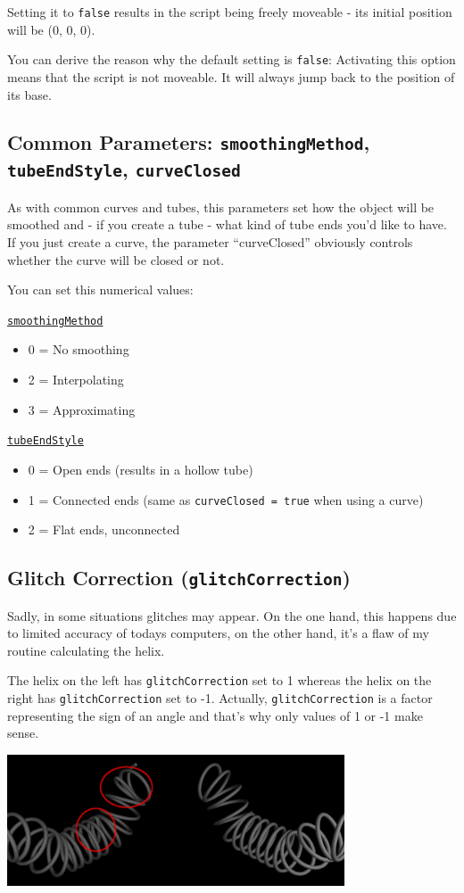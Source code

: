\documentclass[12pt,a4paper]{scrartcl}
\begin{document}
Setting it to \texttt{false} results in the script being freely moveable
- its initial position will be (0, 0, 0).

You can derive the reason why the default setting is \texttt{false}:
Activating this option means that the script is not moveable. It will
always jump back to the position of its base.

\subsection{Common Parameters: \texttt{smoothingMethod}, \texttt{tubeEndStyle}, \texttt{curveClosed}}
As with common curves and tubes, this parameters set how the object
will be smoothed and - if you create a tube - what kind of tube ends
you'd like to have. If you just create a curve, the parameter ``curveClosed''
obviously controls whether the curve will be closed or not.

You can set this numerical values:

\underline{\texttt{smoothingMethod}}
\begin{itemize}
	\item 0 = No smoothing
	\item 2 = Interpolating
	\item 3 = Approximating
\end{itemize}

\underline{\texttt{tubeEndStyle}}
\begin{itemize}
	\item 0 = Open ends (results in a hollow tube)
	\item 1 = Connected ends (same as \texttt{curveClosed = true} when
		using a curve)
	\item 2 = Flat ends, unconnected
\end{itemize}

\subsection{Glitch Correction (\texttt{glitchCorrection})}
Sadly, in some situations glitches may appear. On the one hand, this
happens due to limited accuracy of todays computers, on the other hand,
it's a flaw of my routine calculating the helix.

The helix on the left has \texttt{glitchCorrection} set to 1 whereas
the helix on the right has \texttt{glitchCorrection} set to -1. Actually,
\texttt{glitchCorrection} is a factor representing the sign of an angle
and that's why only values of 1 or -1 make sense.
\begin{center}
	\includegraphics[width=0.75\textwidth]{../pics/glitchCorr-edit.jpg}
\end{center}
\end{document}
